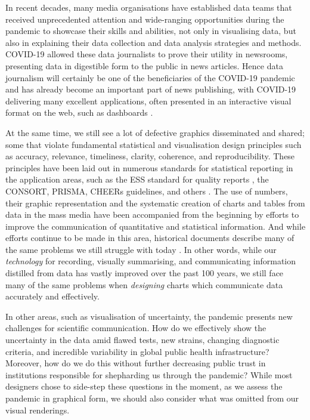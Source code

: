 \documentclass[article]{jdssv}\usepackage[]{graphicx}\usepackage[]{color}
\begin{document}
In recent decades, many media organisations have established data teams that received unprecedented attention and wide-ranging opportunities during the pandemic to showcase their skills and abilities, not only in visualising data, but also in explaining their data collection and data analysis strategies and methods. COVID-19 allowed these data journalists to prove their utility in newsrooms, presenting data in digestible form to the public in news articles. Hence data journalism will certainly be one of the beneficiaries of the COVID-19 pandemic and has already become an important part of news publishing, with COVID-19 delivering many excellent applications, often presented in an interactive visual format on the web, such as dashboards \citep{kochWelcomeRevolutionCOVID192021}.


At the same time, we still see a lot of defective graphics disseminated and shared; some that violate fundamental statistical and visualisation design principles such as accuracy, relevance, timeliness, clarity, coherence, and reproducibility. 
These principles have been laid out in numerous standards for statistical reporting in the application areas, such as the ESS standard for quality reports \citep{ess2009}, the CONSORT, PRISMA, CHEERs guidelines, and others \citep{EQUATORNetworkEnhancing}. 
The use of numbers, their graphic representation and the systematic creation of charts and tables from data in the mass media have been accompanied from the beginning by efforts to improve the communication of quantitative and statistical information. And while efforts continue to be made in this area, historical documents describe many of the same problems we still struggle with today \citep{ASA-standards,haemerPresentationProblemsArea1949,kovermanPLANNINGVISUALPRESENTATION1961,fienbergGraphicalMethodsStatistics1979,Hoffrage2261,Tufte2001,Rosling2011,otavamylona2020}.
In other words, while our \textit{technology} for recording, visually summarising, and communicating information distilled from data has vastly improved over the past 100 years, we still face many of the same problems when \textit{designing} charts which communicate data accurately and effectively.

In other areas, such as visualisation of uncertainty, the pandemic presents new challenges for scientific communication. How do we effectively show the uncertainty in the data amid flawed tests, new strains, changing diagnostic criteria, and incredible variability in global public health infrastructure? Moreover, how do we do this without further decreasing public trust in institutions responsible for shepharding us through the pandemic? While most designers chose to side-step these questions in the moment, as we assess the pandemic in graphical form, we should also consider what was omitted from our visual renderings.
\end{document}
